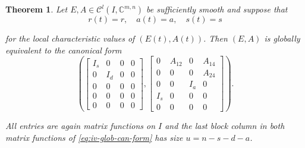 \documentclass[]{book}
\newtheorem{theorem}{Theorem}[chapter]
\theoremstyle{definition}
\theoremstyle{definition}
\theoremstyle{definition}
\theoremstyle{definition}
\theoremstyle{remark}
\begin{document}
\begin{theorem}
\protect\hypertarget{thm:global-canonical-form}{}{\label{thm:global-canonical-form} }
Let \(E, A \in \mathcal C^l(I, \mathbb C^{m,n})\) be sufficiently smooth and suppose that
\begin{equation}
    r(t) = r, \quad a(t)=a, \quad s(t)=s \label{eq:glob-local-char-vals}
\end{equation}

for the local characteristic values of \((E(t), A(t))\). Then \((E, A)\) is globally equivalent to the canonical form
\begin{equation}
\left(
\begin{bmatrix}
I_s &  0  & 0 & 0 \\
0   & I_d & 0 & 0 \\
0   &  0  & 0 & 0 \\
0   &  0  & 0 & 0 \\
0   &  0  & 0 & 0
\end{bmatrix}, 
\begin{bmatrix}
0   & A_{12}&  0  & A_{14} \\
0   &   0   &  0  & A_{24} \\
0   &   0   & I_a & 0 \\
I_s &   0   &  0  & 0 \\
0   &   0   &  0  & 0
\end{bmatrix}
\right ).
\label{eq:iv-glob-can-form}
\end{equation}

All entries are again matrix functions on \(I\) and the last block column in both matrix functions of \eqref{eq:iv-glob-can-form} has size \(u=n-s-d-a\).
\end{theorem}
\end{document}
